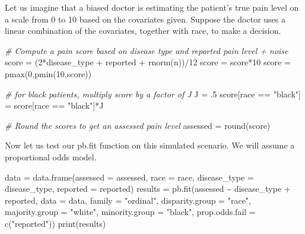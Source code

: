 \documentclass[
]{article}
\newenvironment{Shaded}{\begin{snugshade}}{\end{snugshade}}
\newcommand{\AttributeTok}[1]{\textcolor[rgb]{0.77,0.63,0.00}{#1}}
\newcommand{\CommentTok}[1]{\textcolor[rgb]{0.56,0.35,0.01}{\textit{#1}}}
\newcommand{\DecValTok}[1]{\textcolor[rgb]{0.00,0.00,0.81}{#1}}
\newcommand{\FunctionTok}[1]{\textcolor[rgb]{0.00,0.00,0.00}{#1}}
\newcommand{\NormalTok}[1]{#1}
\newcommand{\OtherTok}[1]{\textcolor[rgb]{0.56,0.35,0.01}{#1}}
\newcommand{\SpecialCharTok}[1]{\textcolor[rgb]{0.00,0.00,0.00}{#1}}
\newcommand{\StringTok}[1]{\textcolor[rgb]{0.31,0.60,0.02}{#1}}
\begin{document}
Let us imagine that a biased doctor is estimating the patient's true
pain level on a scale from 0 to 10 based on the covariates given.
Suppose the doctor uses a linear combination of the covariates, together
with race, to make a decision.

\begin{Shaded}
\begin{Highlighting}[]
 \CommentTok{\# Compute a pain score based on disease type and reported pain level + noise}
\NormalTok{ score }\OtherTok{=}\NormalTok{ (}\DecValTok{2}\SpecialCharTok{*}\NormalTok{disease\_type }\SpecialCharTok{+}\NormalTok{ reported }\SpecialCharTok{+} \FunctionTok{rnorm}\NormalTok{(n))}\SpecialCharTok{/}\DecValTok{12}
\NormalTok{ score }\OtherTok{=}\NormalTok{ score}\SpecialCharTok{*}\DecValTok{10}
\NormalTok{ score }\OtherTok{=} \FunctionTok{pmax}\NormalTok{(}\DecValTok{0}\NormalTok{,}\FunctionTok{pmin}\NormalTok{(}\DecValTok{10}\NormalTok{,score))}
 
 \CommentTok{\# for black patients, multiply score by a factor of J}
\NormalTok{ J }\OtherTok{=}\NormalTok{ .}\DecValTok{5}
\NormalTok{ score[race }\SpecialCharTok{==} \StringTok{"black"}\NormalTok{] }\OtherTok{=}\NormalTok{ score[race }\SpecialCharTok{==} \StringTok{"black"}\NormalTok{]}\SpecialCharTok{*}\NormalTok{J}
 
 \CommentTok{\# Round the scores to get an assessed pain level}
\NormalTok{ assessed }\OtherTok{=} \FunctionTok{round}\NormalTok{(score)}
\end{Highlighting}
\end{Shaded}

Now let us test our pb.fit function on this simulated scenario. We will
assume a proportional odds model.

\begin{Shaded}
\begin{Highlighting}[]
\NormalTok{ data }\OtherTok{=} \FunctionTok{data.frame}\NormalTok{(}\AttributeTok{assessed =}\NormalTok{ assessed,}
                   \AttributeTok{race =}\NormalTok{ race,}
                   \AttributeTok{disease\_type =}\NormalTok{ disease\_type,}
                   \AttributeTok{reported =}\NormalTok{ reported)}
\NormalTok{ results }\OtherTok{=} \FunctionTok{pb.fit}\NormalTok{(assessed }\SpecialCharTok{\textasciitilde{}}\NormalTok{ disease\_type }\SpecialCharTok{+}\NormalTok{ reported,}
                  \AttributeTok{data =}\NormalTok{ data,}
                  \AttributeTok{family =} \StringTok{"ordinal"}\NormalTok{,}
                  \AttributeTok{disparity.group =} \StringTok{"race"}\NormalTok{,}
                  \AttributeTok{majority.group =} \StringTok{"white"}\NormalTok{,}
                  \AttributeTok{minority.group =} \StringTok{"black"}\NormalTok{,}
                  \AttributeTok{prop.odds.fail =} \FunctionTok{c}\NormalTok{(}\StringTok{"reported"}\NormalTok{))}
 \FunctionTok{print}\NormalTok{(results)}
\end{Highlighting}
\end{Shaded}
\end{document}
